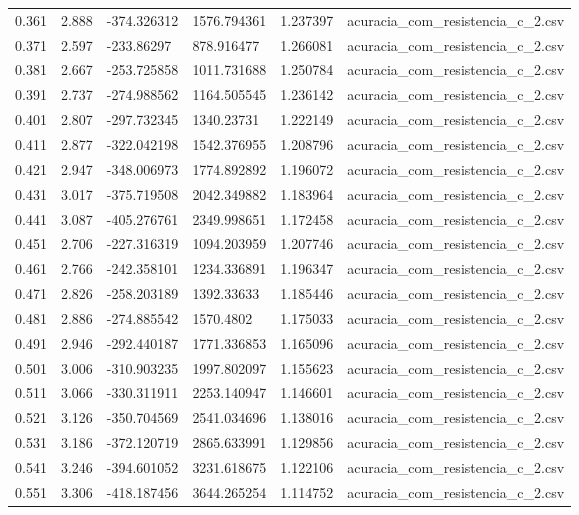 \begin{table}
\begin{tabular}{llllll}
0.361 & 2.888 & -374.326312 & 1576.794361 & 1.237397 & acuracia\_com\_resistencia\_c\_2.csv \\
0.371 & 2.597 & -233.86297 & 878.916477 & 1.266081 & acuracia\_com\_resistencia\_c\_2.csv \\
0.381 & 2.667 & -253.725858 & 1011.731688 & 1.250784 & acuracia\_com\_resistencia\_c\_2.csv \\
0.391 & 2.737 & -274.988562 & 1164.505545 & 1.236142 & acuracia\_com\_resistencia\_c\_2.csv \\
0.401 & 2.807 & -297.732345 & 1340.23731 & 1.222149 & acuracia\_com\_resistencia\_c\_2.csv \\
0.411 & 2.877 & -322.042198 & 1542.376955 & 1.208796 & acuracia\_com\_resistencia\_c\_2.csv \\
0.421 & 2.947 & -348.006973 & 1774.892892 & 1.196072 & acuracia\_com\_resistencia\_c\_2.csv \\
0.431 & 3.017 & -375.719508 & 2042.349882 & 1.183964 & acuracia\_com\_resistencia\_c\_2.csv \\
0.441 & 3.087 & -405.276761 & 2349.998651 & 1.172458 & acuracia\_com\_resistencia\_c\_2.csv \\
0.451 & 2.706 & -227.316319 & 1094.203959 & 1.207746 & acuracia\_com\_resistencia\_c\_2.csv \\
0.461 & 2.766 & -242.358101 & 1234.336891 & 1.196347 & acuracia\_com\_resistencia\_c\_2.csv \\
0.471 & 2.826 & -258.203189 & 1392.33633 & 1.185446 & acuracia\_com\_resistencia\_c\_2.csv \\
0.481 & 2.886 & -274.885542 & 1570.4802 & 1.175033 & acuracia\_com\_resistencia\_c\_2.csv \\
0.491 & 2.946 & -292.440187 & 1771.336853 & 1.165096 & acuracia\_com\_resistencia\_c\_2.csv \\
0.501 & 3.006 & -310.903235 & 1997.802097 & 1.155623 & acuracia\_com\_resistencia\_c\_2.csv \\
0.511 & 3.066 & -330.311911 & 2253.140947 & 1.146601 & acuracia\_com\_resistencia\_c\_2.csv \\
0.521 & 3.126 & -350.704569 & 2541.034696 & 1.138016 & acuracia\_com\_resistencia\_c\_2.csv \\
0.531 & 3.186 & -372.120719 & 2865.633991 & 1.129856 & acuracia\_com\_resistencia\_c\_2.csv \\
0.541 & 3.246 & -394.601052 & 3231.618675 & 1.122106 & acuracia\_com\_resistencia\_c\_2.csv \\
0.551 & 3.306 & -418.187456 & 3644.265254 & 1.114752 & acuracia\_com\_resistencia\_c\_2.csv \\

\end{tabular}
\end{table}
